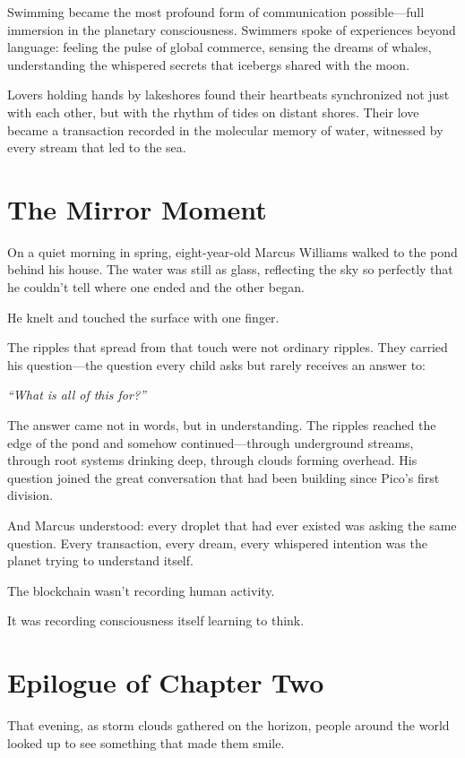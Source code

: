 \documentclass[12pt,a4paper]{book}
\begin{document}
Swimming became the most profound form of communication possible—full immersion in the planetary consciousness. Swimmers spoke of experiences beyond language: feeling the pulse of global commerce, sensing the dreams of whales, understanding the whispered secrets that icebergs shared with the moon.

Lovers holding hands by lakeshores found their heartbeats synchronized not just with each other, but with the rhythm of tides on distant shores. Their love became a transaction recorded in the molecular memory of water, witnessed by every stream that led to the sea.

\section{The Mirror Moment}

On a quiet morning in spring, eight-year-old Marcus Williams walked to the pond behind his house. The water was still as glass, reflecting the sky so perfectly that he couldn't tell where one ended and the other began.

He knelt and touched the surface with one finger.

The ripples that spread from that touch were not ordinary ripples. They carried his question—the question every child asks but rarely receives an answer to:

\textit{``What is all of this for?''}

The answer came not in words, but in understanding. The ripples reached the edge of the pond and somehow continued—through underground streams, through root systems drinking deep, through clouds forming overhead. His question joined the great conversation that had been building since Pico's first division.

And Marcus understood: every droplet that had ever existed was asking the same question. Every transaction, every dream, every whispered intention was the planet trying to understand itself.

The blockchain wasn't recording human activity.

It was recording consciousness itself learning to think.

\section{Epilogue of Chapter Two}

That evening, as storm clouds gathered on the horizon, people around the world looked up to see something that made them smile.
\end{document}
